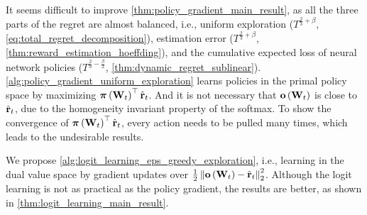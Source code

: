 It seems difficult to improve \cref{thm:policy_gradient_main_result}, as all the three parts of the regret are almost balanced, i.e., uniform exploration ($ T^{\frac{2}{3} + \beta}$, \cref{eq:total_regret_decomposition}), estimation error ($ T^{\frac{2}{3} + \beta} $, \cref{thm:reward_estimation_hoeffding}), and the cumulative expected loss of neural network policies ($ T^{\frac{2}{3} - \frac{\beta}{2}} $, \cref{thm:dynamic_regret_sublinear}). \cref{alg:policy_gradient_uniform_exploration} learns policies in the primal policy space by maximizing ${\boldsymbol{\pi}}\left( {\mathbf{W}}_t \right)^\top \hat{{\mathbf{r}}}_t$. And it is not necessary that ${\mathbf{o}}\left( {\mathbf{W}}_t\right)$ is close to $\hat{{\mathbf{r}}}_t$, due to the homogeneity invariant property of the softmax. To show the convergence of ${\boldsymbol{\pi}}\left( {\mathbf{W}}_t \right)^\top \hat{{\mathbf{r}}}_t$, every action needs to be pulled many times, which leads to the undesirable results.

We propose \cref{alg:logit_learning_eps_greedy_exploration}, i.e., learning in the dual value space by gradient updates over $\frac{1}{2} \left\| {\mathbf{o}}\left( {\mathbf{W}}_t\right) - \hat{{\mathbf{r}}}_t \right\|_2^2$. Although the logit learning is not as practical as the policy gradient, the results are better, as shown in \cref{thm:logit_learning_main_result}.

